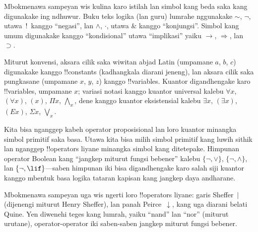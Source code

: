 \documentclass[../../../include/open-logic-section]{subfiles}
\begin{document}

\begin{intro}
Mbokmenawa sampeyan wis kulina karo istilah lan simbol kang beda saka
kang digunakake ing ndhuwur. Buku teks logika (lan guru) lumrahe
nggunakake $\sim$, $\neg$, utawa~!\ kanggo ``negasi'', lan $\wedge$,
$\cdot$, utawa $\&$ kanggo ``konjungsi''. Simbol kang umum digunakake
kanggo ``kondisional'' utawa ``implikasi'' yaiku $\rightarrow$,
$\Rightarrow$, lan $\supset$.

Miturut konvensi, aksara cilik saka wiwitan abjad Latin (umpamane
$a$, $b$, $c$) digunakake kanggo !!{constant}s (kadhangkala diarani
jeneng), lan aksara cilik saka pungkasane (umpamane $x$, $y$, $z$)
kanggo !!{variable}s. Kuantor digandhengake karo !!{variable}s,
umpamane $x$; variasi notasi kanggo kuantor universal kalebu $\forall x$,
$(\forall x)$, $(x)$, $\Pi x$, $\bigwedge_x$, dene kanggo kuantor
eksistensial kalebu $\exists x$, $(\exists
x)$, $(Ex)$, $\Sigma x$, $\bigvee_x$.
\end{intro}

\begin{explain}
Kita bisa nganggep kabeh operator proposisional lan loro kuantor
minangka simbol primitif saka basa. Utawa kita bisa milih simbol
primitif kang luwih sithik lan nganggep !!{operator}s liyane minangka
simbol kang ditetepake. Himpunan operator Boolean kang ``jangkep
miturut fungsi bebener'' kalebu $\{ \lnot, \lor \}$, $\{ \lnot,
\land \}$, lan $\{ \lnot,
\lif\}$---saben himpunan iki bisa digandhengake karo salah siji
kuantor kanggo mbentuk basa logika tataran kapisan kang jangkep daya
andharane.

Mbokmenawa sampeyan uga wis ngerti loro !!{operator}s liyane: garis
Sheffer~$|$ (dijenengi miturut Henry Sheffer), lan panah
Peirce~$\downarrow$, kang uga diarani belati Quine. Yen diwenehi
teges kang lumrah, yaiku ``nand'' lan ``nor'' (miturut urutane),
operator-operator iki saben-saben jangkep miturut fungsi bebener.
\end{explain}
\end{document}

